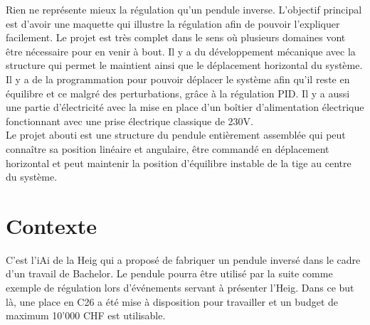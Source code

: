 Rien ne représente mieux la régulation qu'un pendule inverse. L'objectif principal est d'avoir une maquette qui illustre la régulation
afin de pouvoir l'expliquer facilement. Le projet est très complet dans le sens où plusieurs domaines vont être nécessaire pour en venir
à bout. Il y a du développement mécanique avec la structure qui permet le maintient ainsi que le déplacement horizontal du système.
Il y a de la programmation pour pouvoir déplacer le système afin qu'il reste en équilibre et ce malgré des perturbations, grâce à la
régulation PID. Il y a aussi une partie d'électricité avec la mise en place d'un boîtier d'alimentation électrique fonctionnant avec une
prise électrique classique de 230V.\\

Le projet abouti est une structure du pendule entièrement assemblée qui peut connaître sa position linéaire et angulaire, être commandé
en déplacement horizontal et peut maintenir la position d'équilibre instable de la tige au centre du système.

\section{Contexte}
C'est l'\acrlong{iAi} de la \acrshort{Heig} qui a proposé de fabriquer un pendule inversé dans le cadre d'un travail
de Bachelor. Le pendule pourra être utilisé par la suite comme exemple de régulation lors d'événements servant à présenter l'\acrshort{Heig}.
Dans ce but là, une place en C26 a été mise à disposition pour travailler et un budget de maximum 10'000 CHF est utilisable.